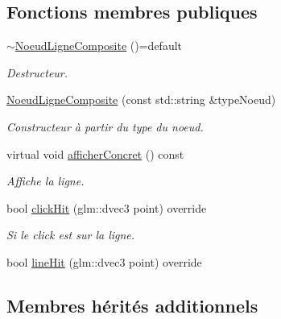 \subsection*{Fonctions membres publiques}
\begin{DoxyCompactItemize}
\item 
\hypertarget{class_noeud_ligne_composite_a08087529aaf006ad8708d276f96c1424}{\hyperlink{class_noeud_ligne_composite_a08087529aaf006ad8708d276f96c1424}{$\sim$\-Noeud\-Ligne\-Composite} ()=default}\label{class_noeud_ligne_composite_a08087529aaf006ad8708d276f96c1424}

\begin{DoxyCompactList}\small\item\em Destructeur. \end{DoxyCompactList}\end{DoxyCompactItemize}
{\bf }\par
\begin{DoxyCompactItemize}
\item 
\hyperlink{class_noeud_ligne_composite_af9846268635cbb0331feab18575c2607}{Noeud\-Ligne\-Composite} (const std\-::string \&type\-Noeud)
\begin{DoxyCompactList}\small\item\em Constructeur à partir du type du noeud. \end{DoxyCompactList}\item 
virtual void \hyperlink{class_noeud_ligne_composite_a24738e9ba75c1b0d69e5a99edcba1682}{afficher\-Concret} () const 
\begin{DoxyCompactList}\small\item\em Affiche la ligne. \end{DoxyCompactList}\item 
bool \hyperlink{class_noeud_ligne_composite_a0cb225b44480c5630d13d3fee60ccbf9}{click\-Hit} (glm\-::dvec3 point) override
\begin{DoxyCompactList}\small\item\em Si le click est sur la ligne. \end{DoxyCompactList}\item 
bool \hyperlink{class_noeud_ligne_composite_a310a9ded7255be42d2a11dab2abcde81}{line\-Hit} (glm\-::dvec3 point) override
\end{DoxyCompactItemize}

\subsection*{Membres hérités additionnels}


